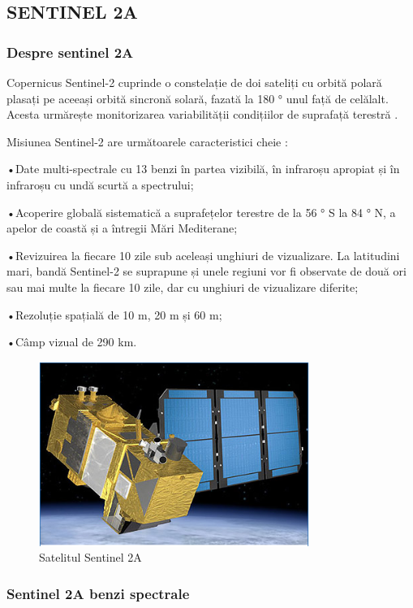 \documentclass[12pt,a4paper]{article}
\theoremstyle{definition}
\theoremstyle{remark}
\begin{document}
 
\subsection{SENTINEL 2A}
\subsubsection{Despre sentinel 2A}

Copernicus Sentinel-2 cuprinde o constelație de doi sateliți cu orbită polară plasați pe aceeași orbită sincronă solară, fazată la 180 ° unul față de celălalt. Acesta urmărește monitorizarea variabilității condițiilor de suprafață terestră \cite{sentinel2a}.

Misiunea Sentinel-2 are următoarele caracteristici cheie \cite{sentinel2a}:

•Date multi-spectrale cu 13 benzi în partea vizibilă, în infraroșu apropiat și în infraroșu cu undă scurtă a spectrului;

•Acoperire globală sistematică a suprafețelor terestre de la 56 ° S la 84 ° N, a apelor de coastă și a întregii Mări Mediterane;

•Revizuirea la fiecare 10 zile sub aceleași unghiuri de vizualizare. La latitudini mari, bandă Sentinel-2 se suprapune și unele regiuni vor fi observate de două ori sau mai multe la fiecare 10 zile, dar cu unghiuri de vizualizare diferite;

•Rezoluție spațială de 10 m, 20 m și 60 m;

•Câmp vizual de 290 km.




\begin{figure}[H]
  \centering
  \includegraphics[width=250pt]{SENTINEL2AINTER.PNG}
  \caption{Satelitul Sentinel 2A \cite{sentinel2a}}   
\end{figure}

\subsubsection{Sentinel 2A benzi spectrale}
\end{document}
